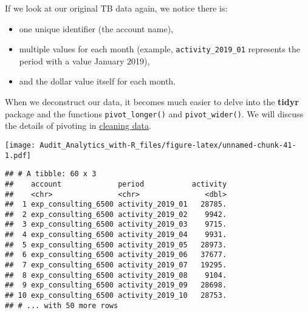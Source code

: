 \documentclass[
]{book}
\newenvironment{Shaded}{\begin{snugshade}}{\end{snugshade}}
\newcommand{\CommentTok}[1]{\textcolor[rgb]{0.56,0.35,0.01}{\textit{#1}}}
\newcommand{\DataTypeTok}[1]{\textcolor[rgb]{0.13,0.29,0.53}{#1}}
\newcommand{\KeywordTok}[1]{\textcolor[rgb]{0.13,0.29,0.53}{\textbf{#1}}}
\newcommand{\NormalTok}[1]{#1}
\newcommand{\OperatorTok}[1]{\textcolor[rgb]{0.81,0.36,0.00}{\textbf{#1}}}
\newcommand{\OtherTok}[1]{\textcolor[rgb]{0.56,0.35,0.01}{#1}}
\newcommand{\StringTok}[1]{\textcolor[rgb]{0.31,0.60,0.02}{#1}}
\providecommand{\tightlist}{%
  \setlength{\itemsep}{0pt}\setlength{\parskip}{0pt}}
\begin{document}
If we look at our original TB data again, we notice there is:

\begin{itemize}
\tightlist
\item
  one unique identifier (the account name),
\item
  multiple values for each month (example, \texttt{activity\_2019\_01} represents the period with a value January 2019),
\item
  and the dollar value itself for each month.
\end{itemize}

When we deconstruct our data, it becomes much easier to delve into the \textbf{tidyr} package and the functions \texttt{pivot\_longer()} and \texttt{pivot\_wider()}. We will discuss the details of pivoting in \protect\hyperlink{clean-pivot}{cleaning data}.

\begin{Shaded}
\end{Shaded}

\texttt{[image: Audit\_Analytics\_with-R\_files/figure-latex/unnamed-chunk-41-1.pdf]}

\begin{Shaded}
\end{Shaded}

\begin{verbatim}
## # A tibble: 60 x 3
##    account             period           activity
##    <chr>               <chr>               <dbl>
##  1 exp_consulting_6500 activity_2019_01   28785.
##  2 exp_consulting_6500 activity_2019_02    9942.
##  3 exp_consulting_6500 activity_2019_03    9715.
##  4 exp_consulting_6500 activity_2019_04    9931.
##  5 exp_consulting_6500 activity_2019_05   28973.
##  6 exp_consulting_6500 activity_2019_06   37677.
##  7 exp_consulting_6500 activity_2019_07   19295.
##  8 exp_consulting_6500 activity_2019_08    9104.
##  9 exp_consulting_6500 activity_2019_09   28698.
## 10 exp_consulting_6500 activity_2019_10   28753.
## # ... with 50 more rows
\end{verbatim}
\end{document}
